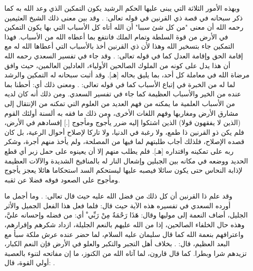 وبهذه الأمور الثلاثة التي يبنى عليها الحكم الرشيد يكون التمكين الذي وعد الله به كما ذكر سبحانه في قصة ذي القرنين في قوله تعالى: 
\quranayah*[18][84-85]{\footnotesize \surahname*[18]}. وقد بين معنى ذلك الشيخ العثيمين رحمه الله أن معنى "من كل شئ سببا" أن الله أتاه كل الأسباب التي بها يكون التمكين في الأرض من قوة السلطة وتمام الملك فانتفع بما أعطاه الله من الأسباب. فهذا التمكين جاء بتسخير الله وهذا لأن ذي القرنين أخذ بالأسباب التي أعطاها الله له مع إقامة الحق وإقامة العدل كما في قوله تعالى: 
\quranayah*[18][87-89]{\footnotesize \surahname*[18]}. وقد جاء في تفسير السعدي رحمه الله أن هذا يدل على كونه من الملوك الصالحين الأولياء، العادلين العالمين، حيث وافق مرضاة الله في معاملة كل أحد، بما يليق بحاله [هـ]. وقد أثبت  سبحانه له التمكين والرشد لما له من الخبرة في إتباع الأسباب كما في قوله تعالى: 
\quranayah*[18][91-92]{\footnotesize \surahname*[18]}. ومعنى ذلك أي: أحطنا بما عنده من الخير والأسباب العظيمة كما جاء في تفسير السعدي. ومن ذلك أنه كان لديه من الأسباب العلمية ما يمكنه من فهم العديد من العلوم التي تمكنه من الإنتقال إلى مشارق الأرض ومغاربها وفهم اللغات الأخرى، ومن ذلك ما فقه به ألسنة أولئك القوم (الذين لا يفقهون قولا) الذين اشتكوا إليه ضرر يأجوج ومأجوج [.] إفسادهم في الأرض، فلم يكن ذو القرنين ذا طمع، ولا رغبة في الدنيا، ولا تاركا لإصلاح أحوال الرعية، بل كان قصده الإصلاح، فلذلك أجاب طلبتهم لما فيها من المصلحة، ولم يأخذ منهم أجرة، وشكر ربه على تمكينه واقتداره [هـ]. فلم يطلب منهم إلا أن يعينوه على حمل زبر أي قطع الحديد ووضعه في مكانه بين الجبلين وإشعال النار له بالمنافيخ الشديدة والآلات العظيمة لإذابة النحاس حتى يكون سائلا فيصبه عليها ليستحكم السد استحكاما هائلا يعجز يأجوج ومأجوج على الصعود فوقه فضلا عن ثقبه. 

وقد علم ذا القرنين أن كل ذلك من فضل الله عليه حيث قال تعالى: 
\quranayah*[18][98]{\footnotesize \surahname*[18]}. وما أجمل ما أورده السعدي في تفسيره هذه الآية حيث قال: 
فلما فعل هذا الفعل الجميل والأثر الجليل، أضاف النعمة إلى موليها وقال: { هَذَا رَحْمَةٌ مِنْ رَبِّي ْ} أي: من فضله وإحسانه عليَّ، وهذه حال الخلفاء الصالحين، إذا من الله عليهم بالنعم الجليلة، ازداد شكرهم وإقرارهم، واعترافهم بنعمة الله كما قال سليمان عليه السلام، لما حضر عنده عرش ملكة سبأ مع البعد العظيم، قال: 
\quranayah*[27][40][19]{\footnotesize \surahname*[27]}.
بخلاف أهل التجبر والتكبر والعلو في الأرض فإن النعم الكبار، تزيدهم شرا وبطرا. كما قال قارون، لما آتاه الله من الكنوز، ما إن مفاتحه لتنوء بالعصبة أولي القوة، قال: 
\quranayah*[28][78][1-6]{\footnotesize \surahname*[28]}. 

